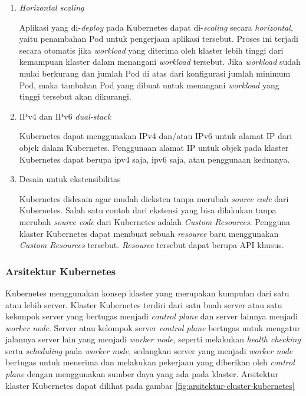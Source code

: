 \begin{enumerate}
    
  \item \emph{Horizontal scaling}

    Aplikasi yang di-\emph{deploy} pada Kubernetes dapat di-\emph{scaling} secara
    \emph{horizontal}, yaitu penambahan Pod untuk pengerjaan aplikasi tersebut. Proses
    ini terjadi secara otomatis jika \emph{workload} yang diterima oleh klaster lebih tinggi
    dari kemampuan klaster dalam menangani \emph{workload} tersebut. Jika \emph{workload}
    sudah mulai berkurang dan jumlah Pod di atas dari konfigurasi jumlah minimum Pod, maka
    tambahan Pod yang dibuat untuk menangani \emph{workload} yang tinggi tersebut akan dikurangi.
    
  \item IPv4 dan IPv6 \emph{dual-stack}

    Kubernetes dapat menggunakan IPv4 dan/atau IPv6 untuk alamat IP dari objek dalam Kubernetes.
    Penggunaan alamat IP untuk objek pada klaster Kubernetes dapat berupa ipv4 saja, ipv6 saja, atau
    penggunaan keduanya.
    
  \item Desain untuk ekstensibilitas

    Kubernetes didesain agar mudah dieksten tanpa merubah \emph{source code} dari Kubernetes.
    Salah satu contoh dari ekstensi yang bisa dilakukan tanpa merubah \emph{source code}
    dari Kubernetes adalah \emph{Custom Resources}. Pengguna klaster Kubernetes dapat
    membuat sebuah \emph{resource} baru menggunakan \emph{Custom Resources} tersebut. \emph{Resource}
    tersebut dapat berupa API khusus.

\end{enumerate}

\subsubsection{Arsitektur Kubernetes}

Kubernetes menggunakan konsep klaster yang merupakan kumpulan dari satu atau
lebih server. Klaster Kubernetes terdiri dari satu buah server atau satu kelompok server yang
bertugas menjadi \emph{control plane} dan server lainnya menjadi \emph{worker node}.
Server atau kelompok server \emph{control plane} bertugas untuk mengatur jalannya
server lain yang menjadi \emph{worker node}, seperti melakukan \emph{health checking} serta
\emph{scheduling} pada \emph{worker node}, sedangkan server yang menjadi \emph{worker node}
bertugas untuk menerima dan melakukan pekerjaan yang diberikan oleh \emph{control plane}
dengan menggunakan sumber daya yang ada pada klaster. Arsitektur
klaster Kubernetes dapat dilihat pada gambar \ref{fig:arsitektur-cluster-kubernetes}

